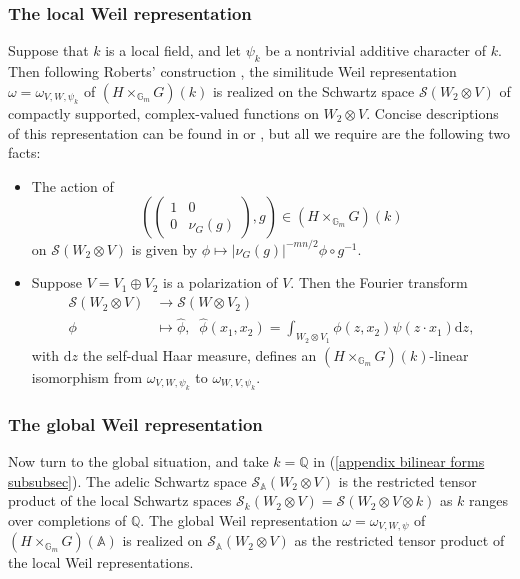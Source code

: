 \documentclass[12pt]{amsart}
\def\bA{\mathbb{A}}
\theoremstyle{definition}
\newcommand{\Z}{\mathbb{Z}}
\newcommand{\Q}{\mathbb{Q}}
\renewcommand{\d}{\mathrm{d}}
\begin{document}
\subsubsection{The local Weil representation}
Suppose that $k$ is a local field, and let $\psi_k$ be a nontrivial additive character of $k$. Then following Roberts' construction \cite{roberts1996theta}, the similitude Weil representation $\omega = \omega_{V, W, \psi_k}$ of $(H \times_{\mathbb G_m} G)(k)$ is realized on the Schwartz space $\mathcal  S(W_2\otimes V)$ of compactly supported, complex-valued functions on $W_2\otimes V$. Concise descriptions of this representation can be found in   \cite[\S2]{gan2011theta} or \cite[\S4]{sweeting2022tateclassesendoscopyoperatornamegsp4}, but all we require are the following two facts:
\begin{itemize}
    \item The action of $$\left(\begin{pmatrix} 1 & 0 \\ 0 & \nu_G(g) \end{pmatrix}, g\right) \in (H \times_{\mathbb G_m} G)(k) $$ on $\mathcal  S(W_2\otimes V)$ is given by $\phi \mapsto |\nu_G(g)|^{-mn/2}\phi \circ g^{-1}.$
    \item Suppose $V = V_1 \oplus V_2$ is a polarization of $V$. Then the Fourier transform
     \begin{equation}\label{appendix eqn:Fourier_transform}\begin{split}
\mathcal  S (W_2\otimes V) &\to \mathcal S(W \otimes V_2)\\
\phi&\mapsto\widehat\phi,\;\;\widehat\phi (x_1, x_2) = \int_{W_2\otimes V_1}\phi (z, x_2)\psi ( z\cdot x_1) \d z,
\end{split}
 \end{equation}
 with $\d z$ the self-dual Haar measure,
 defines an $(H \times_{\mathbb G_m} G)(k)$-linear isomorphism from $\omega_{V, W, \psi_k}$ to $\omega_{W, V, \psi_k}$. 
\end{itemize}
\subsubsection{The global Weil representation}
Now turn to the global situation, and take $k = \Q$ in (\ref{appendix bilinear forms subsubsec}).  
The adelic Schwartz space $\mathcal S_{\bA}(W_2\otimes V)$ is the restricted tensor product of the local Schwartz spaces $\mathcal S_{k}(W_2\otimes V)= \mathcal S(W_2\otimes V\otimes k)$ as $k$ ranges over completions of $\Q$. The global Weil representation $\omega = \omega_{V, W, \psi}$ of $(H \times_{\mathbb G_m} G)(\bA)$ is realized on $\mathcal S_{\bA}(W_2\otimes V)$ as the restricted tensor product of the local Weil representations.
\end{document}
